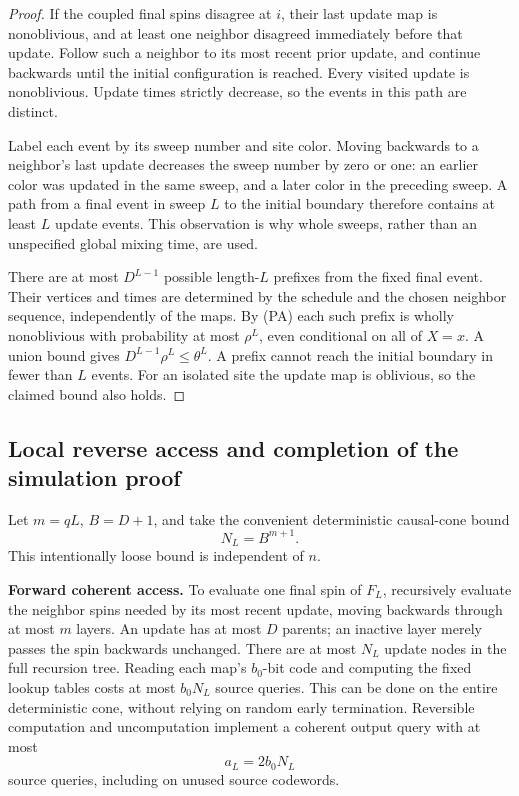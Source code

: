 \documentclass[11pt]{article}
\theoremstyle{definition}
\theoremstyle{remark}
\begin{document}
\begin{proof}
If the coupled final spins disagree at \(i\), their last update map
is nonoblivious, and at least one neighbor disagreed immediately before
that update. Follow such a neighbor to its most recent prior update,
and continue backwards until the initial configuration is reached.
Every visited update is nonoblivious. Update times strictly decrease,
so the events in this path are distinct.

Label each event by its sweep number and site color. Moving backwards
to a neighbor's last update decreases the sweep number by zero or one:
an earlier color was updated in the same sweep, and a later color in
the preceding sweep. A path from a final event in sweep \(L\) to
the initial boundary therefore contains at least \(L\) update events.
This observation is why whole sweeps, rather than an unspecified
global mixing time, are used.

There are at most \(D^{L-1}\) possible length-\(L\) prefixes from
the fixed final event. Their vertices and times are determined by the
schedule and the chosen neighbor sequence, independently of the maps.
By (PA) each such prefix is wholly nonoblivious with probability at
most \(\rho^L\), even conditional on all of \(X=x\). A union bound
gives \(D^{L-1}\rho^L\le\theta^L\). A prefix cannot reach the
initial boundary in fewer than \(L\) events. For an isolated site
the update map is oblivious, so the claimed bound also holds.
\end{proof}

\subsection{Local reverse access and completion of the simulation proof}
\label{resolution-dynamics:simulation}

Let \(m=qL\), \(B=D+1\), and take the convenient deterministic
causal-cone bound
\[
 N_L=B^{m+1}.
\]
This intentionally loose bound is independent of \(n\).

\textbf{Forward coherent access.}
To evaluate one final spin of \(F_L\), recursively evaluate the
neighbor spins needed by its most recent update, moving backwards
through at most \(m\) layers. An update has at most \(D\) parents;
an inactive layer merely passes the spin backwards unchanged.
There are at most \(N_L\) update nodes in the full recursion tree.
Reading each map's \(b_0\)-bit code and computing the fixed lookup
tables costs at most \(b_0N_L\) source queries. This can be done on
the entire deterministic cone, without relying on random early
termination. Reversible computation and uncomputation implement a
coherent output query with at most
\[
 a_L=2b_0N_L
\]
source queries, including on unused source codewords.
\end{document}
